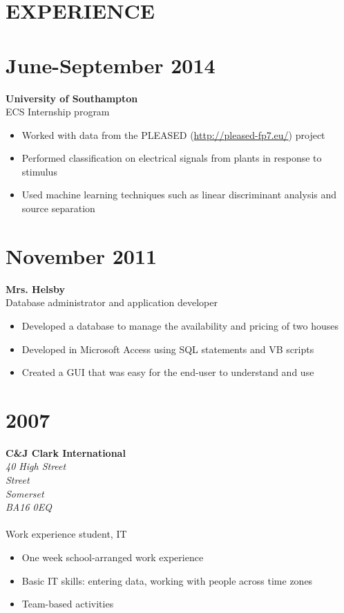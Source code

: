\documentclass[margin]{res}
\begin{document}
\begin{resume}
\section{EXPERIENCE}
\normalsize{\section{June-September 2014}}
	{\bf University of Southampton} \\
	ECS Internship program \\
	\begin{itemize}
	\item Worked with data from the PLEASED (\href{http://pleased-fp7.eu/}{http://pleased-fp7.eu/}) project
	\item Performed classification on electrical signals from plants in response to stimulus
	\item Used machine learning techniques such as linear discriminant analysis and source separation
	\end{itemize}
\normalsize{\section{November 2011}}
	{\bf Mrs. Helsby} \\
	Database administrator and application developer \\
	\begin{itemize}
	\item Developed a database to manage the availability and pricing of two houses
	\item Developed in Microsoft Access using SQL statements and VB scripts
	\item Created a GUI that was easy for the end-user to understand and use
	\end{itemize}
\normalsize{\section{2007}}
	{\bf C\&J Clark International} \\
	{\it 40 High Street \\
	Street \\
	Somerset \\
	BA16 0EQ \\ \\}
	Work experience student, IT \\
	\begin{itemize}
	\item One week school-arranged work experience
	\item Basic IT skills: entering data, working with people across time zones
	\item Team-based activities
	\end{itemize}


\end{resume}
\end{document}
